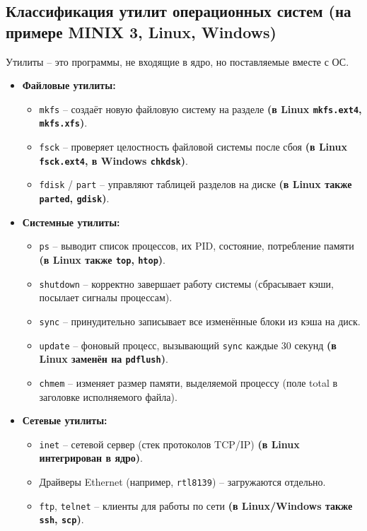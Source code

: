 \documentclass[a4paper,12pt]{article}
\begin{document}
\subsection{Классификация утилит операционных систем (на примере MINIX 3, Linux, Windows)}
Утилиты – это программы, не входящие в ядро, но поставляемые вместе с ОС.
\begin{itemize}
    \item \textbf{Файловые утилиты:}
    \begin{itemize}
        \item \texttt{mkfs} – создаёт новую файловую систему на разделе \textbf{(в Linux \texttt{mkfs.ext4}, \texttt{mkfs.xfs})}.
        \item \texttt{fsck} – проверяет целостность файловой системы после сбоя \textbf{(в Linux \texttt{fsck.ext4}, в Windows \texttt{chkdsk})}.
        \item \texttt{fdisk} / \texttt{part} – управляют таблицей разделов на диске \textbf{(в Linux также \texttt{parted}, \texttt{gdisk})}.
    \end{itemize}
    \item \textbf{Системные утилиты:}
    \begin{itemize}
        \item \texttt{ps} – выводит список процессов, их PID, состояние, потребление памяти \textbf{(в Linux также \texttt{top}, \texttt{htop})}.
        \item \texttt{shutdown} – корректно завершает работу системы (сбрасывает кэши, посылает сигналы процессам).
        \item \texttt{sync} – принудительно записывает все изменённые блоки из кэша на диск.
        \item \texttt{update} – фоновый процесс, вызывающий \texttt{sync} каждые 30 секунд \textbf{(в Linux заменён на \texttt{pdflush})}.
        \item \texttt{chmem} – изменяет размер памяти, выделяемой процессу (поле total в заголовке исполняемого файла).
    \end{itemize}
    \item \textbf{Сетевые утилиты:}
    \begin{itemize}
        \item \texttt{inet} – сетевой сервер (стек протоколов TCP/IP) \textbf{(в Linux интегрирован в ядро)}.
        \item Драйверы Ethernet (например, \texttt{rtl8139}) – загружаются отдельно.
        \item \texttt{ftp}, \texttt{telnet} – клиенты для работы по сети \textbf{(в Linux/Windows также \texttt{ssh}, \texttt{scp})}.

\end{itemize}
\end{itemize}
\end{document}

